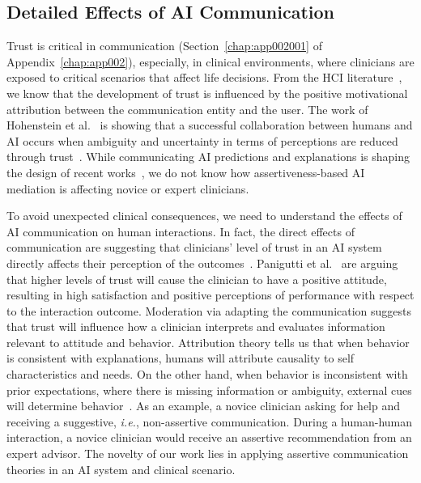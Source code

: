 \subsection{Detailed Effects of AI Communication}
\label{sec:app005003004}

Trust is critical in communication (Section~\ref{chap:app002001} of Appendix~\ref{chap:app002}), especially, in clinical environments, where clinicians are exposed to critical scenarios that affect life decisions.
From the \ac{HCI} literature~\cite{10.1145/3479587, 10.1145/3334480.3375147, 10.1145/3334480.3382842}, we know that the development of trust is influenced by the positive motivational attribution between the communication entity and the user.
The work of Hohenstein et al.~\cite{HOHENSTEIN2020106190} is showing that a successful collaboration between humans and \ac{AI} occurs when ambiguity and uncertainty in terms of perceptions are reduced through trust~\cite{HOHENSTEIN2020106190}.
While communicating \ac{AI} predictions and explanations is shaping the design of recent works~\cite{Lundberg2020}, we do not know how assertiveness-based \ac{AI} mediation is affecting novice or expert clinicians.

To avoid unexpected clinical consequences, we need to understand the effects of \ac{AI} communication on human interactions.
In fact, the direct effects of communication are suggesting that clinicians' level of trust in an \ac{AI} system directly affects their perception of the outcomes~\cite{HOHENSTEIN2020106190}.
Panigutti et al.~\cite{10.1145/3491102.3502104} are arguing that higher levels of trust will cause the clinician to have a positive attitude, resulting in high satisfaction and positive perceptions of performance with respect to the interaction outcome.
Moderation via adapting the communication suggests that trust will influence how a clinician interprets and evaluates information relevant to attitude and behavior.
Attribution theory tells us that when behavior is consistent with explanations, humans will attribute causality to self characteristics and needs.
On the other hand, when behavior is inconsistent with prior expectations, where there is missing information or ambiguity, external cues will determine behavior~\cite{HOHENSTEIN2020106190}.
As an example, a novice clinician asking for help and receiving a suggestive, {\it i.e.}, non-assertive communication.
During a human-human interaction, a novice clinician would receive an assertive recommendation from an expert advisor.
The novelty of our work lies in applying assertive communication theories in an \ac{AI} system and clinical scenario.

